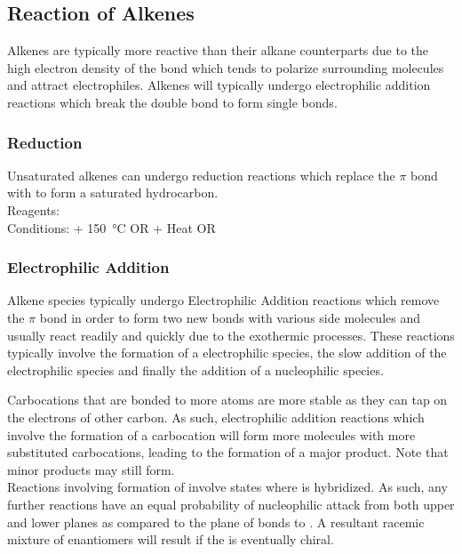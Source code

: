 \documentclass[../main]{subfiles}
\begin{document}
	\subsection{Reaction of Alkenes}
	
	Alkenes are typically more reactive than their alkane counterparts due to the high electron density of the  bond which tends to polarize surrounding molecules and attract electrophiles. Alkenes will typically undergo electrophilic addition reactions which break the double bond to form single bonds.

	\subsubsection{Reduction}

	Unsaturated alkenes can undergo reduction reactions which replace the  \(\pi\) bond with  to form a saturated hydrocarbon. \\

	Reagents:  \\
	Conditions:  + \SI{150}{\celsius} OR  + Heat OR  \\

	\subsubsection{Electrophilic Addition}

	Alkene species typically undergo Electrophilic Addition reactions which remove the  \(\pi\) bond in order to form two new bonds with various side molecules and usually react readily and quickly due to the exothermic processes. These reactions typically involve the formation of a electrophilic species, the slow addition of the electrophilic species and finally the addition of a nucleophilic species.

	Carbocations that are bonded to more  atoms are more stable as they can tap on the electrons of other carbon. As such, electrophilic addition reactions which involve the formation of a carbocation will form more molecules with more substituted carbocations, leading to the formation of a major product. Note that minor products may still form. \\

	Reactions involving formation of  involve states where  is  hybridized. As such, any further reactions have an equal probability of nucleophilic attack from both upper and lower planes as compared to the plane of bonds to . A resultant racemic mixture of enantiomers will result if the  is eventually chiral. \\
\end{document}

